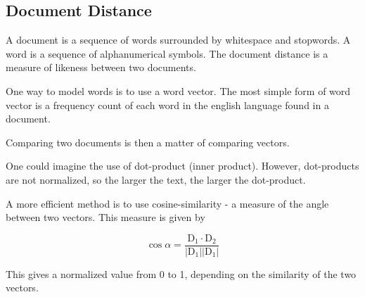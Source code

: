 \documentclass{article}
\begin{document}
\subsection{Document Distance}

A document is a sequence of words surrounded by whitespace and stopwords. A word is a sequence of alphanumerical symbols. The document distance is a measure of likeness between two documents.

One way to model words is to use a word vector. The most simple form of word vector is a frequency count of each word in the english language found in a document.

Comparing two documents is then a matter of comparing vectors.

One could imagine the use of dot-product (inner product). However, dot-products are not normalized, so the larger the text, the larger the dot-product.

A more efficient method is to use cosine-similarity - a measure of the angle between two vectors. This measure is given by

$$
  \cos{\alpha} = \frac{\textrm{D}_1\cdot\textrm{D}_2}{\left| \textrm{D}_1 \right| \left| \textrm{D}_1 \right|}
$$

This gives a normalized value from 0 to 1, depending on the similarity of the two vectors.
\end{document}
